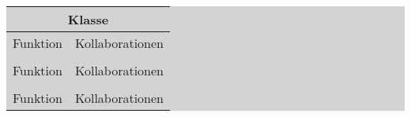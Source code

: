 \documentclass[12pt,a4paper]{article}
\begin{document}
\colorbox{lightgray}{

\begin{tabular}{ p{5cm}|p{5cm}}
 \multicolumn{2}{c}{ Klasse } \\
 \hline
 \hline
 Funktion   & Kollaborationen  \\
 \\
 Funktion   & Kollaborationen  \\
 \\
 Funktion   & Kollaborationen  \\
\end{tabular}
}  %
\end{document}
